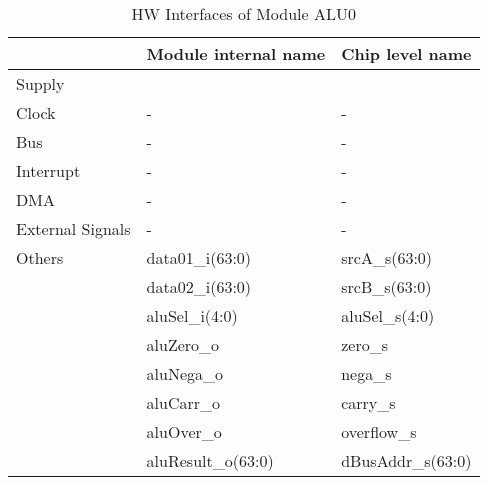 \begin{table}[H]
\caption{HW Interfaces of Module ALU0}
\label{tab:asAluPer02}
\centering
\begin{tabularx}{\textwidth}{|l |l |X|}
  \hline
   & Module internal name & Chip level name \\
  \hline
  \hline
  Supply &  &  \\
  \hline
  Clock & - & - \\
  \hline
  Bus & - & - \\
  \hline
  Interrupt & - & - \\
  \hline
  DMA & - & - \\
  \hline
  External Signals & - & - \\
  \hline
  Others & data01\_i(63:0) & srcA\_s(63:0) \\
         & data02\_i(63:0) & srcB\_s(63:0) \\
         & aluSel\_i(4:0) & aluSel\_s(4:0) \\
         & aluZero\_o & zero\_s \\
         & aluNega\_o & nega\_s \\
         & aluCarr\_o & carry\_s \\
         & aluOver\_o & overflow\_s \\
         & aluResult\_o(63:0) & dBusAddr\_s(63:0) \\
  \hline
\end{tabularx}
\end{table}
